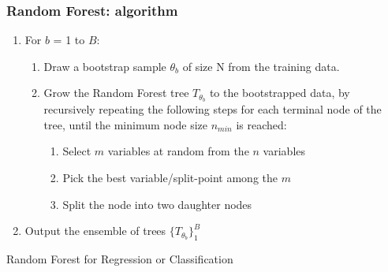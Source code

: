 \begin{frame}
\frametitle{Random Forest: algorithm}

\begin{algorithm}[H]
\SetAlgoLined
\begin{enumerate}
	\item For $b$ = 1 to $B$:
	\begin{enumerate}[a]
	    \item Draw a bootstrap sample $\theta_{b}$ of size N from the training data.
	    \item Grow the Random Forest tree ${{T}_{\theta_{b}}}$ to the bootstrapped data, by recursively repeating the following steps for each terminal node of the tree, until the minimum node size $n_{min}$ is reached:
	    \begin{enumerate}[i]
	       \item Select $m$ variables at random from the $n$ variables
	       \item Pick the best variable/split-point among the $m$
	       \item  Split the node into two daughter nodes
	    \end{enumerate}
	\end{enumerate}
	\item  Output the ensemble of trees $\{{T}_{\theta_{b}}\}_{1}^{B}$
\end{enumerate}
 \caption{Random Forest for Regression or Classification}
\end{algorithm}

\end{frame}















